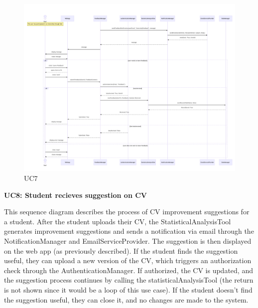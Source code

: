 \begin{figure}[H]
    \centering
    \hspace{-1 cm} %
    \includegraphics[width=1.1\linewidth]{DD//Images/SequenceDiagrams/UC7.pdf}
    \caption{UC7}
\end{figure}

\newpage
\textbf{UC8: Student recieves suggestion on CV}

This sequence diagram describes the process of CV improvement suggestions for a student. After the student uploads their CV, the StatisticalAnalysisTool generates improvement suggestions and sends a notification via email through the NotificationManager and EmailServiceProvider. The suggestion is then displayed on the web app (as previously described). If the student finds the suggestion useful, they can upload a new version of the CV, which triggers an authorization check through the AuthenticationManager. If authorized, the CV is updated, and the suggestion process continues by calling the statisticalAnalysisTool (the return is not shown since it would be a loop of this use case). If the student doesn’t find the suggestion useful, they can close it, and no changes are made to the system.

